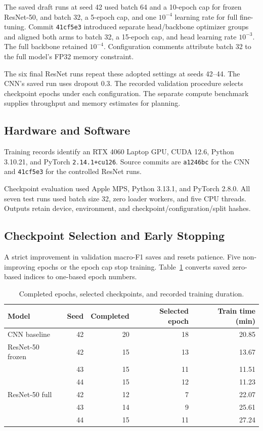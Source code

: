 The saved draft runs at seed 42 used batch 64 and a 10-epoch cap for frozen ResNet-50, and batch 32, a 5-epoch cap, and one $10^{-4}$ learning rate for full fine-tuning. Commit \texttt{41cf5e3} introduced separate head/backbone optimizer groups and aligned both arms to batch 32, a 15-epoch cap, and head learning rate $10^{-3}$. The full backbone retained $10^{-4}$. Configuration comments attribute batch 32 to the full model's FP32 memory constraint.

The six final ResNet runs repeat these adopted settings at seeds 42--44. The CNN's saved run uses dropout 0.3. The recorded validation procedure selects checkpoint epochs under each configuration. The separate compute benchmark supplies throughput and memory estimates for planning.

\subsection{Hardware and Software}

Training records identify an RTX 4060 Laptop GPU, CUDA 12.6, Python 3.10.21, and PyTorch \texttt{2.14.1+cu126}. Source commits are \texttt{a1246bc} for the CNN and \texttt{41cf5e3} for the controlled ResNet runs.

Checkpoint evaluation used Apple MPS, Python 3.13.1, and PyTorch 2.8.0. All seven test runs used batch size 32, zero loader workers, and five CPU threads. Outputs retain device, environment, and checkpoint/configuration/split hashes.

\subsection{Checkpoint Selection and Early Stopping}

A strict improvement in validation macro-F1 saves  and resets patience. Five non-improving epochs or the epoch cap stop training. Table~\ref{tab:a2-checkpoint-epochs} converts saved zero-based indices to one-based epoch numbers.

\begin{table}[H]
    \centering
    \caption{Completed epochs, selected checkpoints, and recorded training duration.}
    \label{tab:a2-checkpoint-epochs}
    \begin{tabular}{lrrrr}
        \toprule
        Model & Seed & Completed & Selected epoch & Train time (min) \\
        \midrule
        CNN baseline & 42 & 20 & 18 & 20.85 \\
        ResNet-50 frozen & 42 & 15 & 13 & 13.67 \\
                         & 43 & 15 & 11 & 11.51 \\
                         & 44 & 15 & 12 & 11.23 \\
        ResNet-50 full & 42 & 12 & 7 & 22.07 \\
                       & 43 & 14 & 9 & 25.61 \\
                       & 44 & 15 & 11 & 27.24 \\
        \bottomrule
    \end{tabular}
\end{table}

